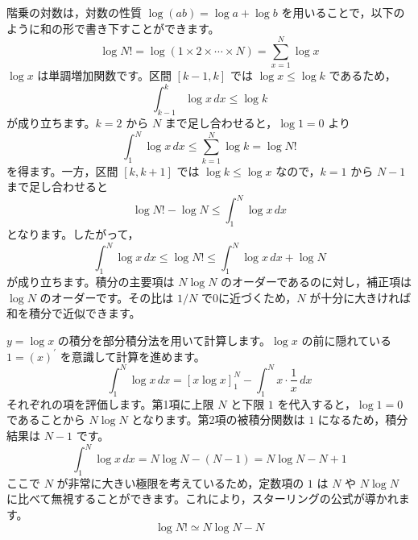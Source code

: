 \solutionheading
\begin{solutionparts}

階乗の対数は，対数の性質 $\log(ab) = \log a + \log b$ を用いることで，以下のように和の形で書き下すことができます。
\begin{equation*}
\log N! = \log (1 \times 2 \times \cdots \times N) = \sum_{x=1}^N \log x
\end{equation*}
$\log x$ は単調増加関数です。区間 $[k-1,k]$ では $\log x \le \log k$ であるため，
\begin{equation*}
\int_{k-1}^{k}\log x\,dx \le \log k
\end{equation*}
が成り立ちます。$k=2$ から $N$ まで足し合わせると，$\log 1=0$ より
\begin{equation*}
\int_1^N\log x\,dx \le \sum_{k=1}^N\log k=\log N!
\end{equation*}
を得ます。一方，区間 $[k,k+1]$ では $\log k\le\log x$ なので，$k=1$ から $N-1$ まで足し合わせると
\begin{equation*}
\log N! - \log N \le \int_1^N\log x\,dx
\end{equation*}
となります。したがって，
\begin{equation*}
\int_1^N \log x \, dx \le \log N! \le \int_1^N \log x \, dx + \log N
\end{equation*}
が成り立ちます。積分の主要項は $N\log N$ のオーダーであるのに対し，補正項は $\log N$ のオーダーです。その比は $1/N$ で0に近づくため，$N$ が十分に大きければ和を積分で近似できます。

$y = \log x$ の積分を部分積分法を用いて計算します。$\log x$ の前に隠れている $1 = (x)^\prime$ を意識して計算を進めます。
\begin{equation*}
\int_1^N \log x \, dx = \left[ x \log x \right]_1^N - \int_1^N x \cdot \frac{1}{x} \, dx
\end{equation*}
それぞれの項を評価します。第1項に上限 $N$ と下限 $1$ を代入すると，$\log 1 = 0$ であることから $N \log N$ となります。第2項の被積分関数は $1$ になるため，積分結果は $N - 1$ です。
\begin{equation*}
\int_1^N \log x \, dx = N \log N - (N - 1) = N \log N - N + 1
\end{equation*}
ここで $N$ が非常に大きい極限を考えているため，定数項の $1$ は $N$ や $N \log N$ に比べて無視することができます。これにより，スターリングの公式が導かれます。
\begin{equation*}
\log N! \simeq N \log N - N
\end{equation*}


\end{solutionparts}
